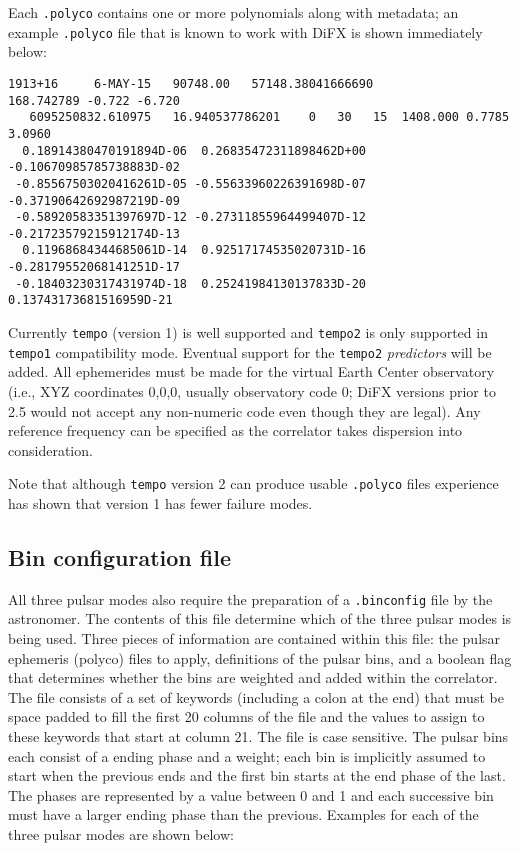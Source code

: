 Each {\tt .polyco} contains one or more polynomials along with metadata; an example {\tt .polyco} file that is known to work with DiFX is shown immediately below:
\begin{verbatim}
1913+16     6-MAY-15   90748.00   57148.38041666690           168.742789 -0.722 -6.720
   6095250832.610975   16.940537786201    0   30   15  1408.000 0.7785   3.0960
  0.18914380470191894D-06  0.26835472311898462D+00 -0.10670985785738883D-02
 -0.85567503020416261D-05 -0.55633960226391698D-07 -0.37190642692987219D-09
 -0.58920583351397697D-12 -0.27311855964499407D-12 -0.21723579215912174D-13
  0.11968684344685061D-14  0.92517174535020731D-16 -0.28179552068141251D-17
 -0.18403230317431974D-18  0.25241984130137833D-20  0.13743173681516959D-21
\end{verbatim}
\noindent
Currently {\tt tempo} (version 1) is well supported and {\tt tempo2} is only supported in {\tt tempo1} compatibility mode.
Eventual support for the {\tt tempo2} {\em predictors} will be added.
All ephemerides must be made for the virtual Earth Center observatory (i.e., XYZ coordinates 0,0,0, usually observatory code 0; DiFX versions prior to 2.5 would not accept any non-numeric code even though they are legal).
Any reference frequency can be specified as the correlator takes dispersion into consideration.

Note that although {\tt tempo} version 2 can produce usable {\tt .polyco} files experience has shown that version 1 has fewer failure modes.

\subsection{Bin configuration file}

All three pulsar modes also require the preparation of a {\tt .binconfig} file by the astronomer.
The contents of this file determine which of the three pulsar modes is being used.
Three pieces of information are contained within this file: the pulsar ephemeris (polyco) files to apply, definitions of the pulsar bins, and a boolean flag that determines whether the bins are weighted and added within the correlator.
The file consists of a set of keywords (including a colon at the end) that must be space padded to fill the first 20 columns of the file and the values to assign
to these keywords that start at column 21.
The file is case sensitive.
The pulsar bins each consist of a ending phase and a weight; each bin is implicitly assumed to start when the previous ends and the first bin starts at the end phase of the last.
The phases are represented by a value between 0 and 1 and each successive bin must have a larger ending phase than the previous.
Examples for each of the three pulsar modes are shown below:

